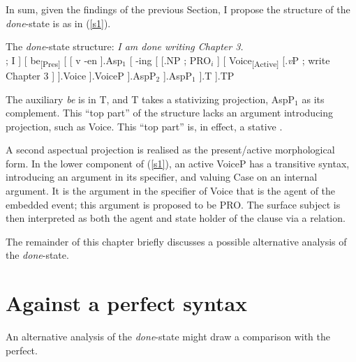 \documentclass[output=paper,modfonts,nonflat]{langsci/langscibook}
\begin{document}
In sum, given the findings of the previous Section, I propose the structure of
the \emph{done}-state is as in (\ref{s1}).\newpage

\begin{exe}
\ex\label{s1} The \emph{done}-state structure: {\em I am done writing Chapter
3.}\\
\vspace{11pt}
    \Tree   [
                [.NP$_i$ \edge[roof]; {I} ]
                [
                    be\textsubscript{[Pres]}
                    [
                        [ v -en ].Asp$_{1}$
                        [ {-ing}
                            [
                                [.NP \edge[roof]; {PRO$_i$} ]
                                [
                                    Voice\textsubscript{[Active]}
                                    [.\emph{v}P \edge[roof]; {write Chapter 3} ]
                                ].Voice
                            ].VoiceP
                        ].AspP$_{2}$
                    ].AspP$_{1}$
                ].T
            ].TP
\end{exe}

The auxiliary \emph{be} is in T, and T takes a stativizing projection,
AspP$_{1}$ as its complement. This \enquote{top part} of the structure lacks an
argument introducing projection, such as Voice. This \enquote{top part} is, in
effect, a stative .

A second aspectual projection is realised as the present/active morphological
form. In the lower component of (\ref{s1}), an active VoiceP has a transitive
syntax, introducing an argument in its specifier, and valuing Case on an
internal argument. It is the argument in the specifier of Voice that is the
agent of the embedded event; this argument is proposed to be PRO\@. The surface
subject is then interpreted as both the agent and state holder of the clause
via a  relation.

The remainder of this chapter briefly discusses a possible alternative analysis
of the \emph{done}-state.

\section{Against a perfect syntax}\label{derivation}

An alternative analysis of the \emph{done}-state might draw a comparison with
the  perfect.
\end{document}
